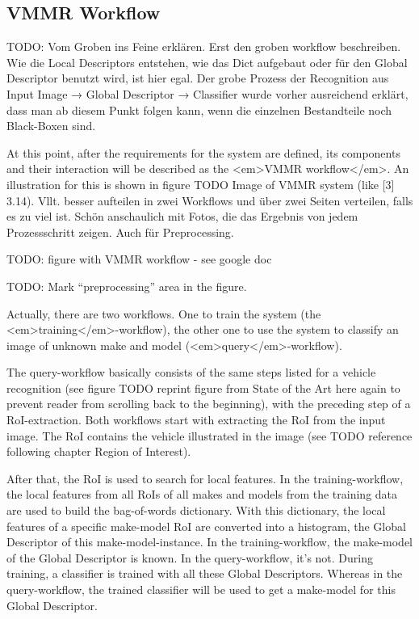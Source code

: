 \subsection{VMMR Workflow}
TODO: Vom Groben ins Feine erklären. Erst den groben workflow beschreiben. Wie die Local Descriptors entstehen, wie das Dict aufgebaut oder für den Global Descriptor benutzt wird, ist hier egal. Der grobe Prozess der Recognition aus Input Image → Global Descriptor → Classifier wurde vorher ausreichend erklärt, dass man ab diesem Punkt folgen kann, wenn die einzelnen Bestandteile noch Black-Boxen sind.

At this point, after the requirements for the system are defined, its components and their interaction will be described as the <em>VMMR workflow</em>. An illustration for this is shown in figure TODO Image of VMMR system (like [3] 3.14). Vllt. besser aufteilen in zwei Workflows und über zwei Seiten verteilen, falls es zu viel ist. Schön anschaulich mit Fotos, die das Ergebnis von jedem Prozessschritt zeigen. Auch für Preprocessing.

TODO: figure with VMMR workflow - see google doc

TODO: Mark “preprocessing” area in the figure.

Actually, there are two workflows. One to train the system (the <em>training</em>-workflow), the other one to use the system to classify an image of unknown make and model (<em>query</em>-workflow).

The query-workflow basically consists of the same steps listed for a vehicle recognition (see figure TODO reprint figure from State of the Art here again to prevent reader from scrolling back to the beginning), with the preceding step of a RoI-extraction. Both workflows start with extracting the RoI from the input image. The RoI contains the vehicle illustrated in the image (see TODO reference following chapter Region of Interest).

After that, the RoI is used to search for local features. In the training-workflow, the local features from all RoIs of all makes and models from the training data are used to build the bag-of-words dictionary. With this dictionary, the local features of a specific make-model RoI are converted into a histogram, the Global Descriptor of this make-model-instance. In the training-workflow, the make-model of the Global Descriptor is known. In the query-workflow, it’s not.
During training, a classifier is trained with all these Global Descriptors. Whereas in the query-workflow, the trained classifier will be used to get a make-model for this Global Descriptor.

